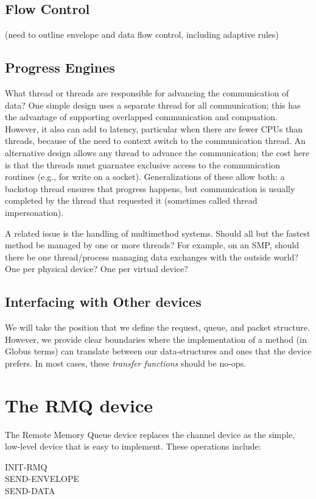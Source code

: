 \documentclass{article}
\begin{document}
\subsection{Flow Control}
(need to outline envelope and data flow control, including adaptive rules)

\subsection{Progress Engines}
What thread or threads are responsible for advancing the communication of
data?  One simple design uses a separate thread for all communication; this
has the advantage of supporting overlapped communication and compuation.
However, it also can add to latency, particular when there are fewer CPUs than
threads, because of the need to context switch to the communication thread.
An alternative design allows any thread to advance the communication; the cost
here is that the threads must guarnatee exclusive access to the communication
routines (e.g., for write on a socket).  Generalizations of these allow both:
a backstop thread ensures that progress happens, but communication is usually
completed by the thread that requested it (sometimes called thread
impersonation).  

A related issue is the handling of multimethod systems.  Should all but the
fastest method be managed by one or more threads?  For example, on an SMP,
should there be one thread/process managing data exchanges with the outside
world?  One per physical device?  One per virtual device?

\subsection{Interfacing with Other devices}
We will take the position that we define the request, queue, and packet
structure.  However, we provide clear boundaries where the implementation of a
method (in Globus terms) can translate between our data-structures and ones
that the device prefers.  In most cases, these \emph{transfer functions}
should be no-ops.

\section{The RMQ device}
The Remote Memory Queue device replaces the channel device as the simple,
low-level device that is easy to implement.   These operations include:
\begin{description}
\item[INIT-RMQ]
\item[SEND-ENVELOPE]
\item[SEND-DATA]
\end{description}
\end{document}
